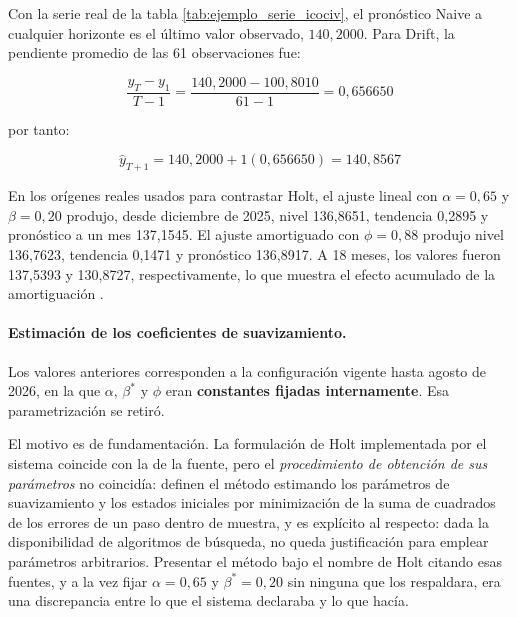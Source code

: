 \documentclass[12pt,letterpaper]{article}
\providecommand{\parencite}{\citep}
\providecommand{\textcite}{\citet}
\begin{document}
Con la serie real de la tabla \ref{tab:ejemplo_serie_icociv}, el pronóstico Naive a cualquier horizonte es el último valor observado, \(140,2000\). Para Drift, la pendiente promedio de las 61 observaciones fue:

\begin{equation}
\frac{y_T-y_1}{T-1}=\frac{140,2000-100,8010}{61-1}=0,656650
\end{equation}

por tanto:

\begin{equation}
\hat{y}_{T+1}=140,2000 + 1(0,656650)=140,8567
\end{equation}

En los orígenes reales usados para contrastar Holt, el ajuste lineal con \(\alpha=0,65\) y \(\beta=0,20\) produjo, desde diciembre de 2025, nivel 136,8651, tendencia 0,2895 y pronóstico a un mes 137,1545. El ajuste amortiguado con \(\phi=0,88\) produjo nivel 136,7623, tendencia 0,1471 y pronóstico 136,8917. A 18 meses, los valores fueron 137,5393 y 130,8727, respectivamente, lo que muestra el efecto acumulado de la amortiguación \parencite{holt1957,gardner_mckenzie1985}.

\paragraph{Estimación de los coeficientes de suavizamiento.} Los valores anteriores corresponden a la configuración vigente hasta agosto de 2026, en la que \(\alpha\), \(\beta^{*}\) y \(\phi\) eran \textbf{constantes fijadas internamente}. Esa parametrización se retiró.

El motivo es de fundamentación. La formulación de Holt implementada por el sistema coincide con la de la fuente, pero el \emph{procedimiento de obtención de sus parámetros} no coincidía: \textcite{hyndman2021fpp3} definen el método estimando los parámetros de suavizamiento y los estados iniciales por minimización de la suma de cuadrados de los errores de un paso dentro de muestra, y \textcite{gardner2006} es explícito al respecto: dada la disponibilidad de algoritmos de búsqueda, no queda justificación para emplear parámetros arbitrarios. Presentar el método bajo el nombre de Holt citando esas fuentes, y a la vez fijar \(\alpha=0,65\) y \(\beta^{*}=0,20\) sin ninguna que los respaldara, era una discrepancia entre lo que el sistema declaraba y lo que hacía.
\end{document}
